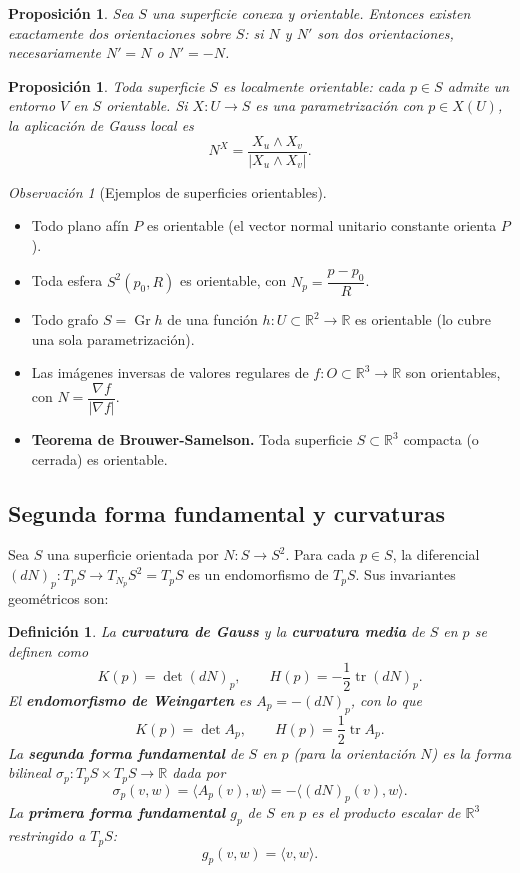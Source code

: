 \documentclass[11pt]{article}
\DeclareMathOperator{\tr}{tr}
\DeclareMathOperator{\Gr}{Gr}
\theoremstyle{plain}
\newtheorem{definicion}[teorema]{Definición}
\newtheorem{proposicion}[teorema]{Proposición}
\theoremstyle{definition}
\theoremstyle{remark}
\newtheorem{observacion}[teorema]{Observación}
\begin{document}
\begin{proposicion}
Sea $S$ una superficie conexa y orientable. Entonces existen exactamente dos orientaciones sobre $S$: si $N$ y $N'$ son dos orientaciones, necesariamente $N' = N$ o $N' = -N$.
\end{proposicion}

\begin{proposicion}
Toda superficie $S$ es localmente orientable: cada $p\in S$ admite un entorno $V$ en $S$ orientable. Si $X:U\to S$ es una parametrización con $p\in X(U)$, la aplicación de Gauss local es
\[
N^X = \frac{X_u\land X_v}{|X_u\land X_v|}.
\]
\end{proposicion}

\begin{observacion}[Ejemplos de superficies orientables]\
\begin{itemize}
\item Todo plano afín $P$ es orientable (el vector normal unitario constante orienta $P$).
\item Toda esfera $S^2(p_0,R)$ es orientable, con $N_p = \dfrac{p-p_0}{R}$.
\item Todo grafo $S = \Gr h$ de una función $h:U\subset\mathbb{R}^2\to\mathbb{R}$ es orientable (lo cubre una sola parametrización).
\item Las imágenes inversas de valores regulares de $f:O\subset\mathbb{R}^3\to\mathbb{R}$ son orientables, con $N = \dfrac{\nabla f}{|\nabla f|}$.
\item \textbf{Teorema de Brouwer-Samelson.} Toda superficie $S\subset\mathbb{R}^3$ compacta (o cerrada) es orientable.
\end{itemize}
\end{observacion}

\subsection{Segunda forma fundamental y curvaturas}

Sea $S$ una superficie orientada por $N:S\to S^2$. Para cada $p\in S$, la diferencial $(dN)_p:T_pS\to T_{N_p}S^2 = T_pS$ es un endomorfismo de $T_pS$. Sus invariantes geométricos son:

\begin{definicion}
La \textbf{curvatura de Gauss} y la \textbf{curvatura media} de $S$ en $p$ se definen como
\[
K(p) = \det(dN)_p, \qquad H(p) = -\frac{1}{2}\tr(dN)_p.
\]
El \textbf{endomorfismo de Weingarten} es $A_p = -(dN)_p$, con lo que
\[
K(p) = \det A_p, \qquad H(p) = \frac{1}{2}\tr A_p.
\]
La \textbf{segunda forma fundamental} de $S$ en $p$ (para la orientación $N$) es la forma bilineal $\sigma_p:T_pS\times T_pS\to\mathbb{R}$ dada por
\[
\sigma_p(v,w) = \langle A_p(v),w\rangle = -\langle (dN)_p(v),w\rangle.
\]
La \textbf{primera forma fundamental} $g_p$ de $S$ en $p$ es el producto escalar de $\mathbb{R}^3$ restringido a $T_pS$:
\[
g_p(v,w) = \langle v,w\rangle.
\]
\end{definicion}
\end{document}
